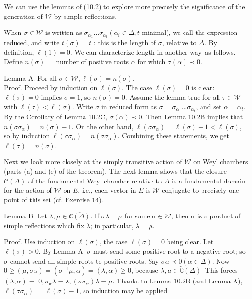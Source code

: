 \documentclass[10pt]{article}
\begin{document}
We can use the lemmas of (10.2) to explore more precisely the significance of the generation of $\mathscr{W}$ by simple reflections.

When $\sigma \in \mathscr{W}$ is written as $\sigma_{\alpha_{1}} \ldots \sigma_{\alpha_{t}}\left(\alpha_{i} \in \Delta, t\right.$ minimal), we call the expression reduced, and write $t(\sigma)=t$ : this is the length of $\sigma$, relative to $\Delta$. By definition, $\ell(1)=0$. We can characterize length in another way, as follows. Define $n(\sigma)=$ number of positive roots $\alpha$ for which $\sigma(\alpha) \prec 0$.

Lemma A. For all $\sigma \in \mathscr{W}, \ell(\sigma)=n(\sigma)$.\\
Proof. Proceed by induction on $\ell(\sigma)$. The case $\ell(\sigma)=0$ is clear: $\ell(\sigma)=0$ implies $\sigma=1$, so $n(\sigma)=0$. Assume the lemma true for all $\tau \in \mathscr{W}$ with $\ell(\tau)<\ell(\sigma)$. Write $\sigma$ in reduced form as $\sigma=\sigma_{\alpha_{1}} \ldots \sigma_{\alpha_{t}}$, and set $\alpha=\alpha_{t}$. By the Corollary of Lemma 10.2C, $\sigma(\alpha) \prec 0$. Then Lemma 10.2B implies that $n\left(\sigma \sigma_{\alpha}\right)=n(\sigma)-1$. On the other hand, $\ell\left(\sigma \sigma_{\alpha}\right)=\ell(\sigma)-1<\ell(\sigma)$, so by induction $\ell\left(\sigma \sigma_{\alpha}\right)=n\left(\sigma \sigma_{\alpha}\right)$. Combining these statements, we get $\ell(\sigma)=n(\sigma)$.

Next we look more closely at the simply transitive action of $\mathscr{W}$ on Weyl chambers (parts (a) and (e) of the theorem). The next lemma shows that the closure $\overline{\mathcal{C}(\Delta)}$ of the fundamental Weyl chamber relative to $\Delta$ is a fundamental domain for the action of $\mathscr{W}$ on $E$, i.e., each vector in $E$ is $\mathscr{W}$ conjugate to precisely one point of this set (cf. Exercise 14).

Lemma B. Let $\lambda, \mu \in \overline{\mathfrak{C}(\Delta)}$. If $\sigma \lambda=\mu$ for some $\sigma \in \mathscr{W}$, then $\sigma$ is a product of simple reflections which fix $\lambda$; in particular, $\lambda=\mu$.

Proof. Use induction on $\ell(\sigma)$, the case $\ell(\sigma)=0$ being clear. Let $\ell(\sigma)>0$. By Lemma A, $\sigma$ must send some positive root to a negative root; so $\sigma$ cannot send all simple roots to positive roots. Say $\sigma \alpha \prec 0(\alpha \in \Delta)$. Now $0 \geq(\mu, \sigma \alpha)=\left(\sigma^{-1} \mu, \alpha\right)=(\lambda, \alpha) \geq 0$, because $\lambda, \mu \in \widetilde{\complement}(\Delta)$. This forces $(\lambda, \alpha)=$ $0, \sigma_{\alpha} \lambda=\lambda,\left(\sigma \sigma_{\alpha}\right) \lambda=\mu$. Thanks to Lemma 10.2B (and Lemma A), $\ell\left(\sigma \sigma_{\alpha}\right)=$ $\ell(\sigma)-1$, so induction may be applied.
\end{document}
